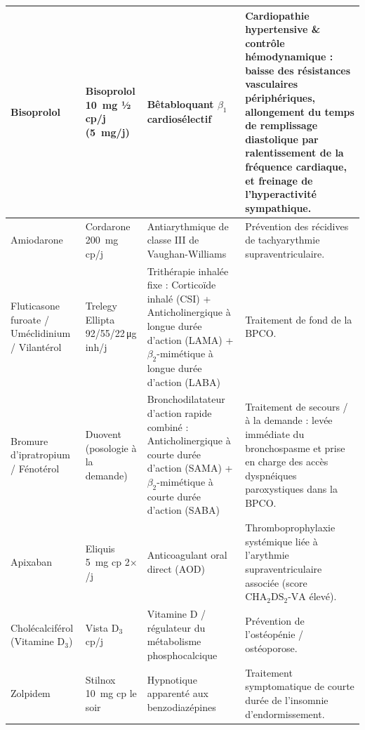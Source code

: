 \begin{landscape}
\begin{ThreePartTable}
\begin{xltabular}{\linewidth}{|L{3.9cm}|L{3.9cm}|L{5.8cm}|Y|}
    Bisoprolol &
    Bisoprolol \qty{10}{\mg} \newline ½ cp/j (\qty{5}{\mg}/j) &
    Bêtabloquant $\beta_1$ cardiosélectif &
    Cardiopathie hypertensive \& contrôle hémodynamique : baisse des résistances vasculaires périphériques, allongement du temps de remplissage diastolique par ralentissement de la fréquence cardiaque, et freinage de l'hyperactivité sympathique. \\
    \hline

    Amiodarone &
    Cordarone \qty{200}{\mg}  cp/j &
    Antiarythmique de classe III de Vaughan-Williams &
    Prévention des récidives de tachyarythmie supraventriculaire. \\
    \hline

    Fluticasone furoate / Uméclidinium / Vilantérol &
    Trelegy Ellipta 92/55/22\,\unit{\ug}  inh/j &
    Trithérapie inhalée fixe : Corticoïde inhalé (CSI) + Anticholinergique à longue durée d'action (LAMA) + $\beta_2$-mimétique à longue durée d'action (LABA) &
    Traitement de fond de la BPCO. \\
    \hline

    Bromure d'ipratropium / Fénotérol &
    Duovent \newline (posologie à la demande) &
    Bronchodilatateur d'action rapide combiné : Anticholinergique à courte durée d'action (SAMA) + $\beta_2$-mimétique à courte durée d'action (SABA) &
    Traitement de secours / à la demande : levée immédiate du bronchospasme et prise en charge des accès dyspnéiques paroxystiques dans la BPCO. \\
    \hline

    Apixaban &
    Eliquis \qty{5}{\mg}  cp 2$\times$/j &
    Anticoagulant oral direct (AOD) &
    Thromboprophylaxie systémique liée à l'arythmie supraventriculaire associée (score $\mathrm{CHA_2DS_2}\text{-}\mathrm{VA}$ élevé). \\
    \hline

    Cholécalciférol (Vitamine $\mathrm{D_3}$) &
    Vista $\mathrm{D_3}$  cp/j &
    Vitamine D / régulateur du métabolisme phosphocalcique &
    Prévention de l'ostéopénie / ostéoporose. \\
    \hline

    Zolpidem &
    Stilnox \qty{10}{\mg}  cp le soir &
    Hypnotique apparenté aux benzodiazépines &
    Traitement symptomatique de courte durée de l'insomnie d'endormissement. \\
    \hline


\end{xltabular}
\end{ThreePartTable}
\end{landscape}
